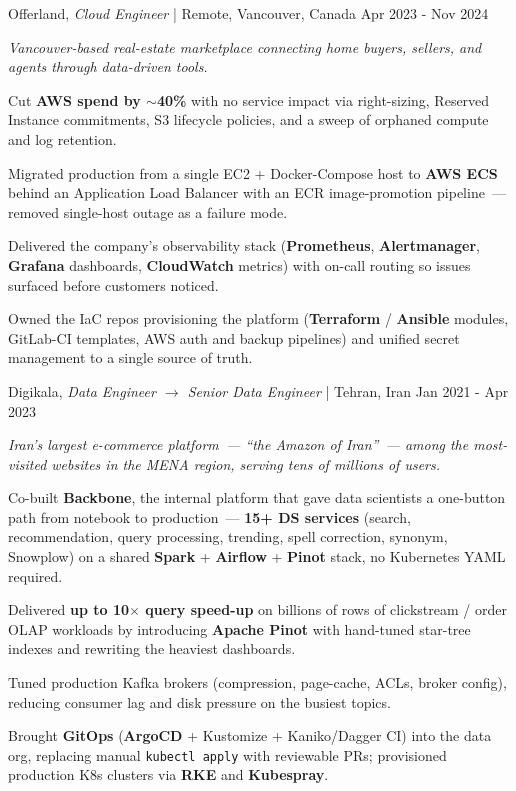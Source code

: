 \begin{cventries2}
  \cventrynew
    {Offerland, \textnormal{\textit{Cloud Engineer} | Remote, Vancouver, Canada}}
    {Apr 2023 - Nov 2024}
    {
      {\small\itshape Vancouver-based real-estate marketplace connecting home buyers, sellers, and agents through data-driven tools.}\par\vspace{4mm}
      \begin{cvitems}
        \item Cut {\bf AWS spend by $\sim$40\%} with no service impact via right-sizing, Reserved Instance commitments, S3 lifecycle policies, and a sweep of orphaned compute and log retention.
        \item Migrated production from a single EC2 + Docker-Compose host to {\bf AWS ECS} behind an Application Load Balancer with an ECR image-promotion pipeline~--- removed single-host outage as a failure mode.
        \item Delivered the company's observability stack ({\bf Prometheus}, {\bf Alertmanager}, {\bf Grafana} dashboards, {\bf CloudWatch} metrics) with on-call routing so issues surfaced before customers noticed.
        \item Owned the IaC repos provisioning the platform ({\bf Terraform} / {\bf Ansible} modules, GitLab-CI templates, AWS auth and backup pipelines) and unified secret management to a single source of truth.
      \end{cvitems}
    }

  \cventrynew
    {Digikala, \textnormal{\textit{Data Engineer $\rightarrow$ Senior Data Engineer} | Tehran, Iran}}
    {Jan 2021 - Apr 2023}
    {
      {\small\itshape Iran's largest e-commerce platform~--- ``the Amazon of Iran''~--- among the most-visited websites in the MENA region, serving tens of millions of users.}\par\vspace{4mm}
      \begin{cvitems}
        \item Co-built {\bf Backbone}, the internal platform that gave data scientists a one-button path from notebook to production~--- {\bf 15+ DS services} (search, recommendation, query processing, trending, spell correction, synonym, Snowplow) on a shared {\bf Spark} + {\bf Airflow} + {\bf Pinot} stack, no Kubernetes YAML required.
        \item Delivered {\bf up to 10$\times$ query speed-up} on billions of rows of clickstream / order OLAP workloads by introducing {\bf Apache Pinot} with hand-tuned star-tree indexes and rewriting the heaviest dashboards.
        \item Tuned production Kafka brokers (compression, page-cache, ACLs, broker config), reducing consumer lag and disk pressure on the busiest topics.
        \item Brought {\bf GitOps} ({\bf ArgoCD} + Kustomize + Kaniko/Dagger CI) into the data org, replacing manual \texttt{kubectl apply} with reviewable PRs; provisioned production K8s clusters via {\bf RKE} and {\bf Kubespray}.
      \end{cvitems}
    }


\end{cventries2}
